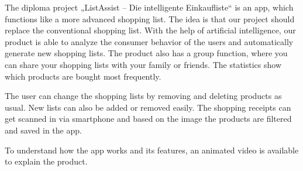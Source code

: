 
The diploma project „ListAssist -- Die intelligente Einkaufliste“ is an app, 
which functions like a more advanced shopping list.
The idea is that our project should replace the conventional shopping list. 
With the help of artificial intelligence, our 
product is able to analyze the consumer behavior of the users 
and automatically generate new shopping lists. 
The product also has a group function, where you can share your 
shopping lists with your family or friends. 
The statistics show which products are bought most frequently. 

The user can change the shopping lists by removing and deleting 
products as usual. New lists can also be 
added or removed easily. The shopping receipts can get scanned in via 
smartphone and based on the image the products are filtered and 
saved in the app.

To understand how the app works and its features, an animated video
is available to explain the product.


